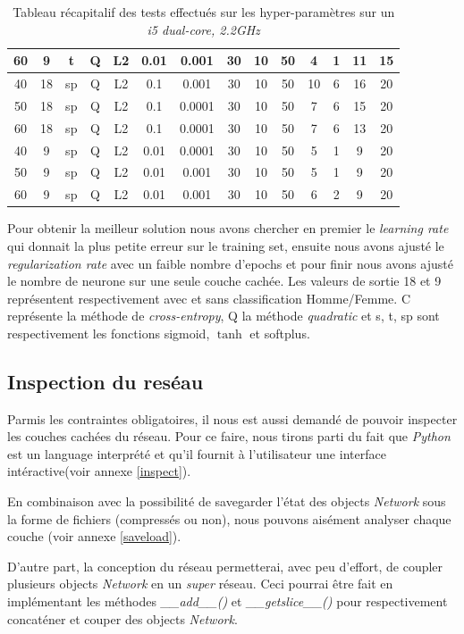 \documentclass[11pt]{article}
\begin{document}
\begin{table}[h]
\begin{tabular}{|c|c|c|c|c|c|c|c|c|c|c|c|c|c|}
		\hline
		60	& 9 & t & Q & L2 & 0.01 & 0.001 & 30 & 10 & 50 & 4 & 1 & 11  & 15\\
		\hline
		40	& 18 & sp & Q & L2 & 0.1 & 0.001 & 30 & 10 & 50 & 10 & 6 & 16  & 20\\
		\hline
		50	& 18 & sp & Q & L2 & 0.1 & 0.0001 & 30 & 10 & 50 & 7 & 6 & 15  & 20\\
		\hline
		60	& 18 & sp & Q & L2 & 0.1 & 0.0001 & 30 & 10 & 50 & 7 & 6 & 13  & 20\\
		\hline
		40	& 9 & sp & Q & L2 & 0.01 & 0.0001 & 30 & 10 & 50 & 5 & 1 & 9  & 20\\
		\hline
		50	& 9 & sp & Q & L2 & 0.01 & 0.001 & 30 & 10 & 50 & 5 & 1 & 9  & 20\\
		\hline
		60	& 9 & sp & Q & L2 & 0.01 & 0.001 & 30 & 10 & 50 & 6 & 2 & 9  & 20\\

		\hline
\end{tabular}
  \caption{Tableau r\'ecapitalif des tests effectu\'es sur les
	hyper-param\`etres sur un {\em i5 dual-core, 2.2GHz} }
\end{table}
Pour obtenir la meilleur solution nous avons chercher en premier le
{\em learning rate}  qui donnait la plus petite erreur sur le training set,
ensuite nous avons
ajust\'e le {\em regularization rate} avec un faible nombre d'epochs et pour
finir nous avons ajust\'e le nombre de neurone sur une seule couche cach\'ee.
Les valeurs de sortie 18 et 9 repr\'esentent respectivement avec et sans
classification Homme/Femme.
C repr\'esente la m\'ethode de {\em cross-entropy}, Q la m\'ethode {\em quadratic}
et s, t, sp sont respectivement les fonctions sigmoid, $\tanh$ et softplus.

\newpage
\subsection{Inspection du res\'eau}
Parmis les contraintes obligatoires, il nous est aussi demand\'e de pouvoir
inspecter les couches cach\'ees du r\'eseau. Pour ce faire, nous tirons parti du
fait que {\em Python} est un language interpr\'et\'e et qu'il fournit \`a
l'utilisateur une interface int\'eractive(voir annexe \ref{inspect}).

En combinaison avec la possibilit\'e de savegarder l'\'etat des
objects {\em Network} sous la forme de fichiers (compress\'es ou non), nous
pouvons ais\'ement analyser chaque couche (voir annexe \ref{saveload}).

D'autre part, la conception du r\'eseau permetterai, avec peu d'effort, de coupler
plusieurs objects {\em Network} en un {\em super} r\'eseau.
Ceci pourrai \^etre fait en impl\'ementant les m\'ethodes {\em \_\_add\_\_()}
et {\em \_\_getslice\_\_()} pour respectivement concat\'ener et couper des objects
{\em Network}.
\end{document}
